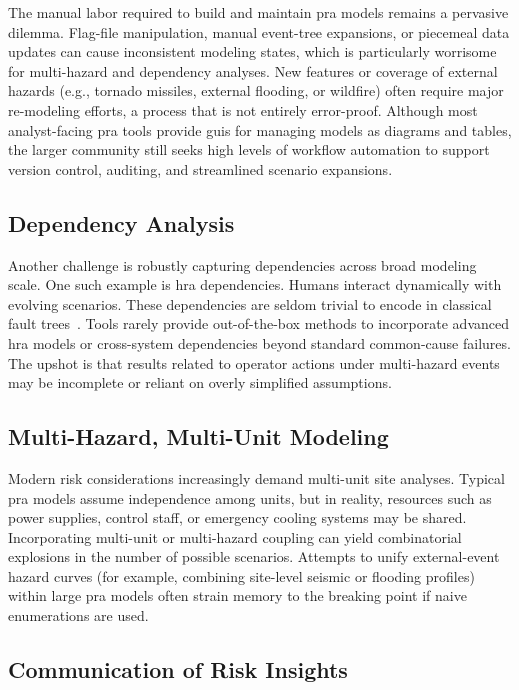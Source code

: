 The manual labor required to build and maintain \acrshort{pra} models remains a pervasive dilemma. Flag-file manipulation, manual event-tree expansions, or piecemeal data updates can cause inconsistent modeling states, which is particularly worrisome for multi-hazard and dependency analyses. New features or coverage of external hazards (e.g., tornado missiles, external flooding, or wildfire) often require major re-modeling efforts, a process that is not entirely error-proof. Although most analyst-facing \acrshort{pra} tools provide \acrshort{gui}s for managing models as diagrams and tables, the larger community still seeks high levels of workflow automation to support version control, auditing, and streamlined scenario expansions.

\subsection{Dependency Analysis}

Another challenge is robustly capturing dependencies across broad modeling scale. One such example is \acrfull{hra} dependencies. Humans interact dynamically with evolving scenarios. These dependencies are seldom trivial to encode in classical fault trees~\cite{diaconeasa_ads-idac_2017, diaconeasa_branching_2018}. Tools rarely provide out-of-the-box methods to incorporate advanced \acrshort{hra} models or cross-system dependencies beyond standard common-cause failures. The upshot is that results related to operator actions under multi-hazard events may be incomplete or reliant on overly simplified assumptions.

\subsection{Multi-Hazard, Multi-Unit Modeling}

Modern risk considerations increasingly demand multi-unit site analyses. Typical \acrshort{pra} models assume independence among units, but in reality, resources such as power supplies, control staff, or emergency cooling systems may be shared. Incorporating multi-unit or multi-hazard coupling can yield combinatorial explosions in the number of possible scenarios. Attempts to unify external-event hazard curves (for example, combining site-level seismic or flooding profiles) within large \acrshort{pra} models often strain memory to the breaking point if naive enumerations are used.

\subsection{Communication of Risk Insights}

